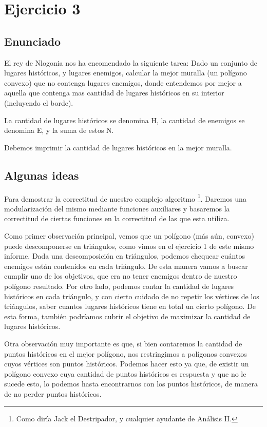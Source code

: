 \section{Ejercicio 3}




\subsection{Enunciado}

El rey de Nlogonia nos ha encomendado la siguiente tarea: Dado un conjunto de lugares históricos, y lugares enemigos, calcular la mejor muralla (un polígono convexo) que no contenga lugares enemigos, donde entendemos por mejor a aquella que contenga mas cantidad de lugares históricos en su interior (incluyendo el borde).

La cantidad de lugares históricos se denomina H, la cantidad de enemigos se denomina E, y la suma de estos N.

Debemos imprimir la cantidad de lugares históricos en la mejor muralla.

\subsection{Algunas ideas}
\par{Para demostrar la correctitud de nuestro complejo algoritmo \footnote{Como diría Jack el Destripador, y cualquier ayudante de Análisis II.}. Daremos una modularización del mismo mediante funciones auxiliares y basaremos la correctitud de ciertas funciones en la correctitud de las que esta utiliza.} \newline
\par{Como primer observación principal, vemos que un polígono (más aún, convexo) puede descomponerse en triángulos, como vimos en el ejercicio 1 de este mismo informe. Dada una descomposición en triángulos, podemos chequear cuántos enemigos están contenidos en cada triángulo. De esta manera vamos a buscar cumplir uno de los objetivos, que era no tener enemigos dentro de nuestro polígono resultado. Por otro lado, podemos contar la cantidad de lugares históricos en cada triángulo, y con cierto cuidado de no repetir los vértices de los triángulos, saber cuantos lugares históricos tiene en total un cierto polígono. De esta forma, también podríamos cubrir el objetivo de maximizar la cantidad de lugares históricos.} \newline
\par{Otra observación muy importante es que, si bien contaremos la cantidad de puntos históricos en el mejor polígono, nos restringimos a polígonos convexos cuyos vértices son puntos históricos. Podemos hacer esto ya que, de existir un polígono convexo cuya cantidad de puntos históricos es respuesta y que no le sucede esto, lo podemos  hasta encontrarnos con los puntos históricos, de manera de no perder puntos históricos.} \newline

